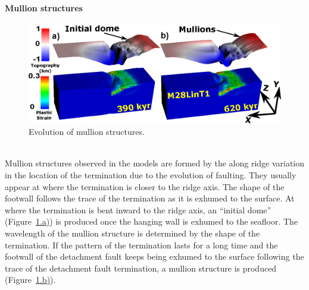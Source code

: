 \paragraph{Mullion structures}

\begin{figure}[h]
  \centering
    \includegraphics[width=1.0\textwidth]{./Figures/fig_Results_3_2_6_mullion_evolution.eps}
  \caption{Evolution of mullion structures.}
 \label{fig_Results_3_2_6_mullion_evolution}
\end{figure}
~\\
Mullion structures observed in the models are formed by the along ridge variation in the location of the termination due to the evolution of faulting. They usually appear at where the termination is closer to the ridge axis. The shape of the footwall follows the trace of the termination as it is exhumed to the surface. At where the termination is bent inward to the ridge axis, an ``initial dome'' (Figure~\hyperref[fig_Results_3_2_6_mullion_evolution]{\ref{fig_Results_3_2_6_mullion_evolution}.a)}) is produced once the hanging wall is exhumed to the seafloor. The wavelength of the mullion structure is determined by the shape of the termination. If the pattern of the termination lasts for a long time and the footwall of the detachment fault keeps being exhumed to the surface following the trace of the detachment fault termination, a mullion structure is produced (Figure~\hyperref[fig_Results_3_2_6_mullion_evolution]{\ref{fig_Results_3_2_6_mullion_evolution}.b)}). 


